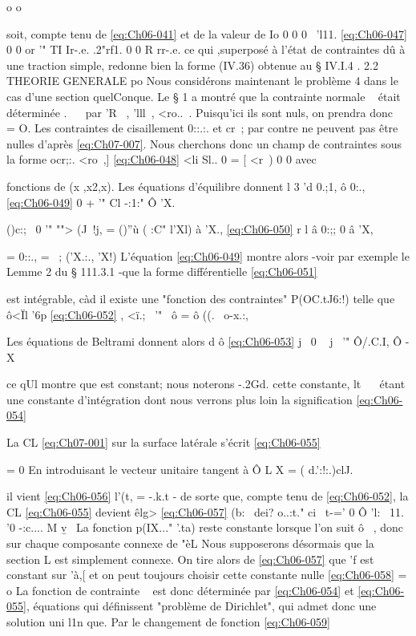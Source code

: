 o 
o 

soit, compte tenu de \eqref{eq:Ch06-041} et de la valeur de Io 
0 0 0 
~'l11.
\eqref{eq:Ch06-047} 
0 0
or '" 
TI Ir-.e. 
.2"rf1. 
0 0 
R rr-.e. 
ce qui ,superposé à l'état de contraintes dû à une traction simple, redonne 
bien la forme (IV.36) obtenue au § IV.I.4 . 
2.2 THEORIE GENERALE 
po 
Nous considérons maintenant le problème 4 dans le cas d'une section 
quelConque. Le § 1 a montré que la contrainte normale ~ était déterminée
. 
~~ 
par 'R~ , 'lll~, <ro..~. Puisqu'ici ils sont nuls, on prendra donc ~~ = O. Les contraintes de cisaillement 0::.:. et cr~; par contre ne peuvent pas être nulles d'après \eqref{eq:Ch07-007}. Nous cherchons donc un champ de contraintes sous la forme 
ocr;:. <ro~,]
\eqref{eq:Ch06-048} <li 
Sl.. 0
= [
<r~) 0 0 
avec 

fonctions de (x ,x2,x). Les équations d'équilibre donnent
l 3
'd 0.;1, ô 0:.,
\eqref{eq:Ch06-049} 0
+ '" 
Cl -:1:" Ô 'X.~ 

()c:;~ 0
'" ""> (J~!j, = ()''ù ( :C" l'Xl) 
à 'X.,
\eqref{eq:Ch06-050} r 
l â 0:;; 
0 
â 'X, 

= 0::., = ~; ('X.:., 'X!) 
L'équation \eqref{eq:Ch06-049} montre alors -voir par exemple le Lemme 2 du § 111.3.1 -que la forme différentielle 
\eqref{eq:Ch06-051} 

est intégrable, càd il existe une "fonction des contraintes" P(OC.tJ6:!) telle 
que 
ô<Ïl '6p
\eqref{eq:Ch06-052} ,
<ï.;~ '" ~ô = 
ô ((.~ o-x.:, 

Les équations de Beltrami donnent alors 
d ô
\eqref{eq:Ch06-053} j~ 0
~ 
j~ '" 
Ô/.C.I, Ô -X~ 

ce qUl montre que est constant; nous noterons -.2Gd. cette constante,
lt~ 
~ étant une constante d'intégration dont nous verrons plus loin la signifi­cation 
\eqref{eq:Ch06-054} 

La CL \eqref{eq:Ch07-001} sur la surface latérale s'écrit 
\eqref{eq:Ch06-055} 

= 0 
En introduisant le vecteur unitaire 
tangent à Ô L 
X = ( d.':!:.)clJ. 

il vient 
\eqref{eq:Ch06-056} 
l'(t, = -.k.t -­
de sorte que, compte tenu de \eqref{eq:Ch06-052}, la CL \eqref{eq:Ch06-055} devient 
êlg>
\eqref{eq:Ch06-057} (b:~ dei? o..:t." ci~ 
t-=' 0 Ô 'l:~ 11. '0 -:c.... M v\b ~ 
La fonction p(IX..." '.ta) reste constante lorsque l'on suit ô~ , donc sur cha­que composante connexe de "èL Nous supposerons désormais que la section L 
est simplement connexe. On tire alors de \eqref{eq:Ch06-057} que 'f est constant sur 'à,[ et 
on peut toujours choisir cette constante nulle 
\eqref{eq:Ch06-058} = o 
La fonction de contrainte ~ est donc déterminée par \eqref{eq:Ch06-054} et \eqref{eq:Ch06-055}, équations 
qui définissent "problème de Dirichlet", qui admet donc une solution uni­
l1n 
que. Par le changement de fonction 
\eqref{eq:Ch06-059} 

